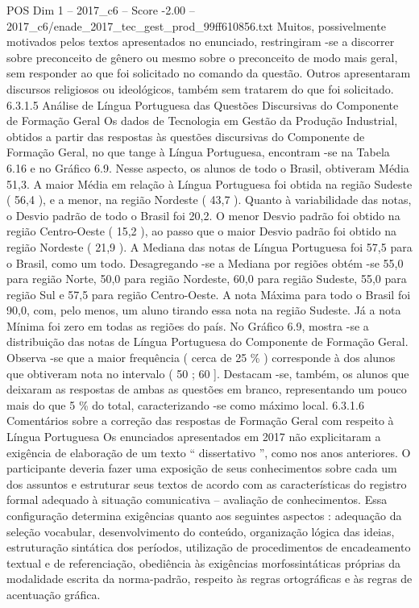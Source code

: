 \begin{textsample}{POS Dim 1 – 2017\_c6 – Score -2.00 – 2017\_c6/enade\_2017\_tec\_gest\_prod\_99ff610856.txt}
Muitos, possivelmente motivados pelos textos apresentados no enunciado, restringiram -se a discorrer sobre preconceito de gênero ou mesmo sobre o preconceito de modo mais geral, sem responder ao que foi solicitado no comando da questão.
Outros apresentaram discursos religiosos ou ideológicos, também sem tratarem do que foi solicitado. 6.3.1.5 Análise de Língua Portuguesa das Questões Discursivas do Componente de Formação Geral Os dados de Tecnologia em Gestão da Produção Industrial, obtidos a partir das respostas às questões discursivas do Componente de Formação Geral, no que tange à Língua Portuguesa, encontram -se na Tabela 6.16 e no Gráfico 6.9.
Nesse aspecto, os alunos de todo o Brasil, obtiveram Média 51,3.
A maior Média em relação à Língua Portuguesa foi obtida na região Sudeste ( 56,4 ), e a menor, na região Nordeste ( 43,7 ).
Quanto à variabilidade das notas, o Desvio padrão de todo o Brasil foi 20,2.
O menor Desvio padrão foi obtido na região Centro-Oeste ( 15,2 ), ao passo que o maior Desvio padrão foi obtido na região Nordeste ( 21,9 ).
A Mediana das notas de Língua Portuguesa foi 57,5 para o Brasil, como um todo.
Desagregando -se a Mediana por regiões obtém -se 55,0 para região Norte, 50,0 para região Nordeste, 60,0 para região Sudeste, 55,0 para região Sul e 57,5 para região Centro-Oeste.
A nota Máxima para todo o Brasil foi 90,0, com, pelo menos, um aluno tirando essa nota na região Sudeste.
Já a nota Mínima foi zero em todas as regiões do país.
No Gráfico 6.9, mostra -se a distribuição das notas de Língua Portuguesa do Componente de Formação Geral.
Observa -se que a maior frequência ( cerca de 25 \% ) corresponde à dos alunos que obtiveram nota no intervalo ( 50 ; 60 ].
Destacam -se, também, os alunos que deixaram as respostas de ambas as questões em branco, representando um pouco mais do que 5 \% do total, caracterizando -se como máximo local. 6.3.1.6 Comentários sobre a correção das respostas de Formação Geral com respeito à Língua Portuguesa Os enunciados apresentados em 2017 não explicitaram a exigência de elaboração de um texto “ dissertativo ”, como nos anos anteriores.
O participante deveria fazer uma exposição de seus conhecimentos sobre cada um dos assuntos e estruturar seus textos de acordo com as características do registro formal adequado à situação comunicativa – avaliação de conhecimentos.
Essa configuração determina exigências quanto aos seguintes aspectos : adequação da seleção vocabular, desenvolvimento do conteúdo, organização lógica das ideias, estruturação sintática dos períodos, utilização de procedimentos de encadeamento textual e de referenciação, obediência às exigências morfossintáticas próprias da modalidade escrita da norma-padrão, respeito às regras ortográficas e às regras de acentuação gráfica.

\end{textsample}
